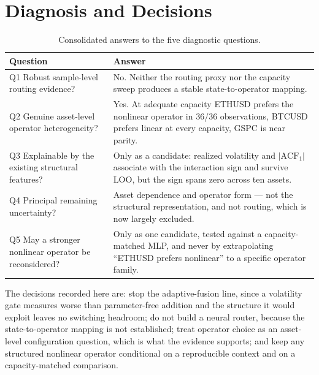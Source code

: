 \documentclass[conference]{IEEEtran}
\begin{document}
\section{Diagnosis and Decisions}
\begin{table}[!t]
\caption{Consolidated answers to the five diagnostic questions.}
\label{tab:q}
\centering
\small
\begin{tabular}{@{}p{}p{}@{}}
\toprule
Question & Answer \\
\midrule
Q1 Robust sample-level routing evidence? &
No. Neither the routing proxy nor the capacity sweep produces a stable state-to-operator mapping. \\
Q2 Genuine asset-level operator heterogeneity? &
Yes. At adequate capacity ETHUSD prefers the nonlinear operator in 36/36 observations, BTCUSD
prefers linear at every capacity, GSPC is near parity. \\
Q3 Explainable by the existing structural features? &
Only as a candidate: realized volatility and $|\mathrm{ACF}_1|$ associate with the interaction sign
and survive LOO, but the sign spans zero across ten assets. \\
Q4 Principal remaining uncertainty? &
Asset dependence and operator form --- not the structural representation, and not routing, which
is now largely excluded. \\
Q5 May a stronger nonlinear operator be reconsidered? &
Only as one candidate, tested against a capacity-matched MLP, and never by extrapolating
``ETHUSD prefers nonlinear'' to a specific operator family. \\
\bottomrule
\end{tabular}
\end{table}

The decisions recorded here are: stop the adaptive-fusion line, since a volatility gate measures
worse than parameter-free addition and the structure it would exploit leaves no switching
headroom; do not build a neural router, because the state-to-operator mapping is not established;
treat operator choice as an asset-level configuration question, which is what the evidence
supports; and keep any structured nonlinear operator conditional on a reproducible context and on
a capacity-matched comparison.
\end{document}
